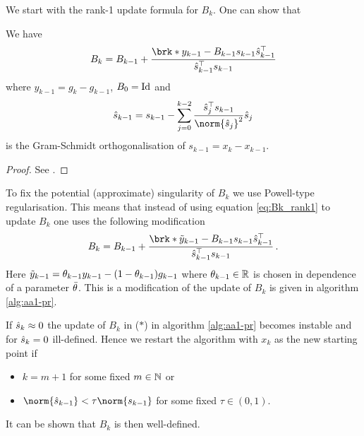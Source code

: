 	
We start with the rank-1 update formula for $B_k$. One can show that
\begin{proposition}
	We have
	\begin{align}
		B_{k} = B_{k-1}+\frac{\brk*{y_{k-1}-B_{k-1}s_{k-1}}\hs_{k-1}^\top}{\hs_{k-1}^\top s_{k-1}}\label{eq:Bk_rank1}
	\end{align}
	where $y_{k-1} = g_{k}-g_{k-1}$, $B_0=\operatorname{Id}$ and
	\begin{align*}
		\hs_{k-1} = s_{k-1}-\sum_{j=0}^{k-2}\frac{\hs_j^\top s_{k-1}}{\norm{\hs_j}^2}\hs_j
	\end{align*}
	is the Gram-Schmidt orthogonalisation of $s_{k-1}=x_{k}-x_{k-1}$.
\end{proposition}
\begin{proof}
	See \cite{ZhaAA}.
\end{proof}
To fix the potential (approximate) singularity of $B_k$ we use Powell-type regularisation. This means that instead of using equation \ref{eq:Bk_rank1} to update $B_k$ one uses the following modification
\begin{align*}
		B_{k} = B_{k-1}+\frac{\brk*{\tiy_{k-1}-B_{k-1}s_{k-1}}\hs_{k-1}^\top}{\hs_{k-1}^\top s_{k-1}}\,.
\end{align*}
Here $\tilde{y}_{k-1}=\theta_{k-1}y_{k-1}-(1-\theta_{k-1})g_{k-1}$ where $\theta_{k-1}\in\mathbb{R}$ is chosen in dependence of a parameter $\bar{\theta}$.
This is a modification of the update of $B_k$ is given in algorithm \ref{alg:aa1-pr}.

If $\hat{s}_k\approx 0$ the update of $B_k$ in ($*$) in algorithm \ref{alg:aa1-pr} becomes instable and for $\hat{s}_k=0$ ill-defined.
Hence we restart the algorithm with $x_k$ as the new starting point if
\begin{itemize}
	\item $k=m+1$ for some fixed $m\in\mathbb{N}$ or
	\item $\norm{\hs_{k-1}}<\tau\norm{s_{k-1}}$ for some fixed $\tau\in(0,1)$.
\end{itemize}
It can be shown that $B_k$ is then well-defined.

